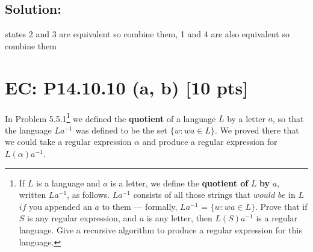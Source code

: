 \documentclass[12pt]{article}
\begin{document}
\subsection*{\textbf{Solution:}}
\begin{center}
    \end{center}
     \label{2}
states 2 and 3 are equivalent so combine them, 1 and 4 are also equivalent so combine them
\begin{center}
    \end{center}
     \label{3}

\newpage
\section*{\textbf{EC: P14.10.10 (a, b)} [10 pts]}
In Problem 5.5.1\footnote{If $L$ is a language and $a$ is a letter, we define the \textbf{quotient of} $L$ \textbf{by} $a$, written $La^{-1}$, as follows. $La^{-1}$ consists of all those strings that $would$ $be$ in $L$ $if$ you appended an $a$ to them --- formally, $La^{-1}$ = $\{w : wa \in L\}$. Prove that if $S$ is any regular expression, and $a$ is any letter, then $L(S)a^{-1}$ is a regular language. Give a recursive algorithm to produce a regular expression for this language.} we defined the \textbf{quotient} of a language $L$ by a letter $a$, so that the language $La^{-1}$ was defined to be the set $\{w : wa \in L\}$. We proved there that we could take a regular expression $\alpha$ and produce a regular expression for $L(\alpha)a^{-1}$.
\end{document}
